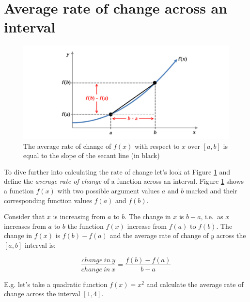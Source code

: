 \documentclass[
]{book}
\theoremstyle{definition}
\theoremstyle{definition}
\theoremstyle{definition}
\theoremstyle{remark}
\begin{document}
\hypertarget{average-rate-of-change-across-an-interval}{%
\section{Average rate of change across an interval}\label{average-rate-of-change-across-an-interval}}

\begin{figure}

{\centering \includegraphics{figures/precourse/math-differentiation-01} 

}

\caption{The average rate of change of $f(x)$ with respect to $x$ over $[a, b]$ is equal to the slope of the secant line (in black)}\label{fig:diff-01}
\end{figure}

To dive further into calculating the rate of change let's look at Figure \ref{fig:diff-01} and define the \emph{average rate of change} of a function across an interval. Figure \ref{fig:diff-01} shows a function \(f(x)\) with two possible argument values \(a\) and \(b\) marked and their corresponding function values \(f(a)\) and \(f(b)\).

Consider that \(x\) is increasing from \(a\) to \(b\). The change in \(x\) is \(b-a\), i.e.~as \(x\) increases from \(a\) to \(b\) the function \(f(x)\) increase from \(f(a)\) to \(f(b)\). The change in \(f(x)\) is \(f(b)-f(a)\) and the average rate of change of \(y\) across the \([a,b]\) interval is:

\begin{equation}
\frac{change\:in\:y}{change\:in\:x}=\frac{f(b)-f(a)}{b-a}
\label{eq:diff-point}
\end{equation}

E.g. let's take a quadratic function \(f(x)=x^2\) and calculate the average rate of change across the interval \([1, 4]\).
\end{document}
